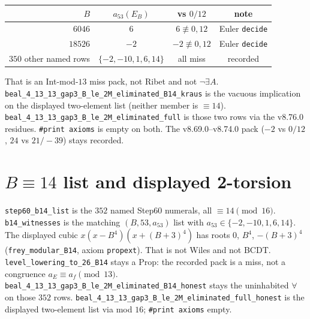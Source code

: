 \documentclass[12pt]{amsart}
\begin{document}
\begin{center}
\begin{tabular}{rccc}
$B$ & $a_{53}(E_B)$ & vs $0/12$ & note \\
\hline
$6046$ & $6$ & $6\not\equiv 0,12$ & Euler \texttt{decide} \\
$18526$ & $-2$ & $-2\not\equiv 0,12$ & Euler \texttt{decide} \\
$350$ other named rows & $\{-2,-10,1,6,14\}$ & all miss & recorded
\end{tabular}
\end{center}

That is an Int-mod-$13$ miss pack, not Ribet and not
$\neg\exists A$.
\texttt{beal\_4\_13\_13\_gap3\_B\_le\_2M\_eliminated\_B14\_kraus}
is the vacuous implication on the displayed two-element list
(neither member is $\equiv 14$).
\texttt{beal\_4\_13\_13\_gap3\_B\_le\_2M\_eliminated\_full}
is those two rows via the v8.76.0 residues.
\texttt{\#print axioms} is empty on both.
The v8.69.0--v8.74.0 pack ($-2$ vs $0/12$, $24$ vs $21/-39$)
stays recorded.

\section{$B\equiv 14$ list and displayed 2-torsion}
\texttt{step60\_b14\_list} is the $352$ named Step60
numerals, all $\equiv 14\pmod{16}$.
\texttt{b14\_witnesses} is the matching
$(B,53,a_{53})$ list with
$a_{53}\in\{-2,-10,1,6,14\}$.
The displayed cubic
$x(x-B^4)(x+(B+3)^4)$ has roots
$0$, $B^4$, $-(B+3)^4$
(\texttt{frey\_modular\_B14}, axiom \texttt{propext}).
That is not Wiles and not BCDT.
\texttt{level\_lowering\_to\_26\_B14} stays a Prop:
the recorded pack is a miss, not a congruence
$a_E\equiv a_f\pmod{13}$.
\texttt{beal\_4\_13\_13\_gap3\_B\_le\_2M\_eliminated\_B14\_honest}
stays the uninhabited $\forall$ on those $352$ rows.
\texttt{beal\_4\_13\_13\_gap3\_B\_le\_2M\_eliminated\_full\_honest}
is the displayed two-element list via mod $16$;
\texttt{\#print axioms} empty.
\end{document}
